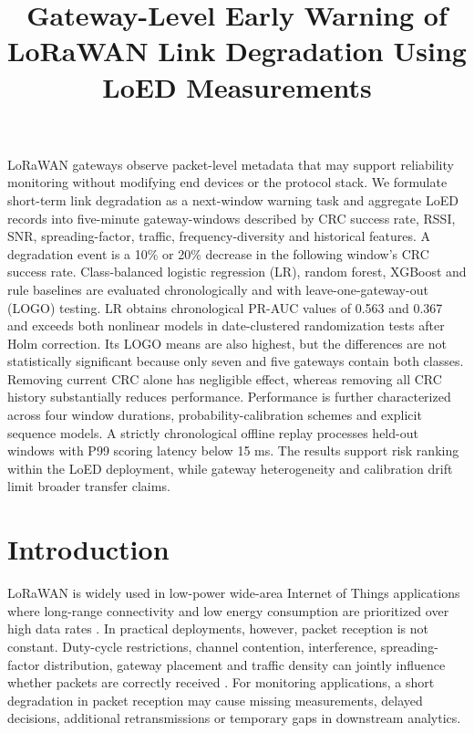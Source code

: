 \documentclass{jot}
\title{Gateway-Level Early Warning of LoRaWAN Link Degradation Using LoED Measurements}
\begin{document}
\maketitle

\begin{Abstract}
LoRaWAN gateways observe packet-level metadata that may support reliability monitoring without modifying end devices or the protocol stack. We formulate short-term link degradation as a next-window warning task and aggregate LoED records into five-minute gateway-windows described by CRC success rate, RSSI, SNR, spreading-factor, traffic, frequency-diversity and historical features. A degradation event is a 10\% or 20\% decrease in the following window's CRC success rate. Class-balanced logistic regression (LR), random forest, XGBoost and rule baselines are evaluated chronologically and with leave-one-gateway-out (LOGO) testing. LR obtains chronological PR-AUC values of 0.563 and 0.367 and exceeds both nonlinear models in date-clustered randomization tests after Holm correction. Its LOGO means are also highest, but the differences are not statistically significant because only seven and five gateways contain both classes. Removing current CRC alone has negligible effect, whereas removing all CRC history substantially reduces performance. Performance is further characterized across four window durations, probability-calibration schemes and explicit sequence models. A strictly chronological offline replay processes held-out windows with P99 scoring latency below 15 ms. The results support risk ranking within the LoED deployment, while gateway heterogeneity and calibration drift limit broader transfer claims.
\end{Abstract}

\section{Introduction}\label{s:1}
LoRaWAN is widely used in low-power wide-area Internet of Things applications where long-range connectivity and low energy consumption are prioritized over high data rates \cite{1,2}. In practical deployments, however, packet reception is not constant. Duty-cycle restrictions, channel contention, interference, spreading-factor distribution, gateway placement and traffic density can jointly influence whether packets are correctly received \cite{3,4}. For monitoring applications, a short degradation in packet reception may cause missing measurements, delayed decisions, additional retransmissions or temporary gaps in downstream analytics.
\end{document}
